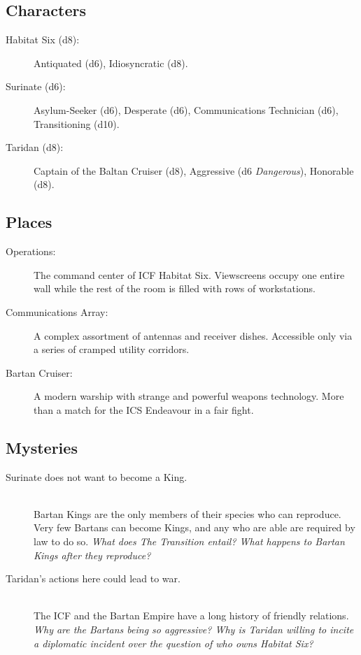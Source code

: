 \documentclass[11pt, a5paper, parskip=half-, DIV=12]{scrartcl}
\begin{document}
\newpage

\subsection*{Characters}
\begin{description}
	\item[Habitat Six (d8):] Antiquated (d6), Idiosyncratic (d8). 
	\item[Surinate (d6):] Asylum-Seeker (d6), Desperate (d6), Communications Technician (d6), Transitioning (d10).
	\item[Taridan (d8):] Captain of the Baltan Cruiser (d8), Aggressive (d6 \textit{Dangerous}), Honorable (d8).
\end{description}

\subsection*{Places}
\begin{description}
	\item[Operations:] The command center of ICF Habitat Six. Viewscreens occupy one entire wall while the rest of the room is filled with rows of workstations.
	\item[Communications Array:] A complex assortment of antennas and receiver dishes. Accessible only via a series of cramped utility corridors.
	\item[Bartan Cruiser:] A modern warship with strange and powerful weapons technology. More than a match for the ICS Endeavour in a fair fight.
\end{description}

\subsection*{Mysteries}
\begin{description}
	\item[Surinate does not want to become a King.]\phantom{a}\\ Bartan Kings are the only members of their species who can reproduce. Very few Bartans can become Kings, and any who are able are required by law to do so. \textit{ What does The Transition entail? What happens to Bartan Kings after they reproduce?}

	\item[Taridan's actions here could lead to war.]\phantom{a}\\
	The ICF and the Bartan Empire have a long history of friendly relations. \textit{Why are the Bartans being so aggressive? Why is Taridan willing to incite a diplomatic incident over the question of who owns Habitat Six?}
\end{description}
\end{document}
